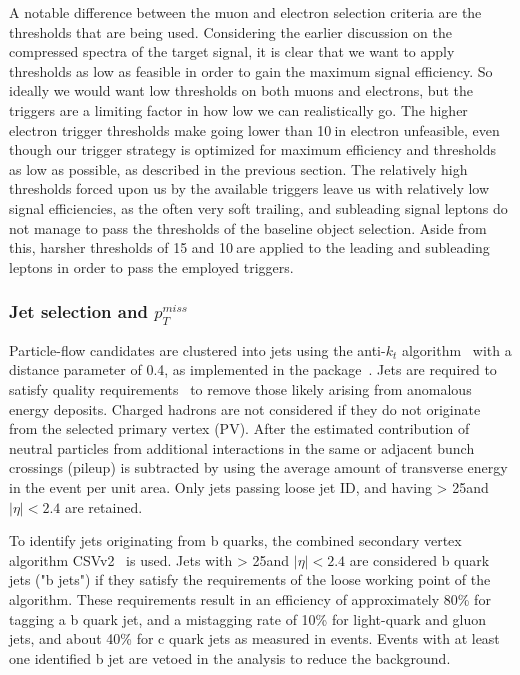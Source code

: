 A notable difference between the muon and electron selection criteria
are the \pt thresholds that are being used. Considering the earlier
discussion on the compressed \pt spectra of the target signal, it is
clear that we want to apply \pt thresholds as low as feasible in order
to gain the maximum signal efficiency. So ideally we would want low
\pt thresholds on both muons and electrons, but the triggers are a
limiting factor in how low we can realistically go. The higher
electron trigger thresholds make going lower than 10\GeV $\:$in electron \pt unfeasible, even though our trigger strategy is
optimized for maximum efficiency and thresholds as low as possible, as
described in the previous section. The relatively high \pt thresholds forced upon us by the available
triggers leave us with relatively low signal efficiencies, as the
often very soft trailing, and subleading signal leptons do not manage
to pass the thresholds of the baseline object selection.
 Aside from this, harsher \pt thresholds of 15 and 10\GeV $\:$are applied
 to the leading and subleading leptons in order to pass the employed
 triggers.

\subsubsection{Jet selection and $p_{T}^{miss}$}\label{sec:jet}
Particle-flow candidates are clustered into jets using the anti-$k_t$ algorithm~\cite{Cacciari_2008} with a distance parameter of 0.4, 
as implemented in the \FASTJET package~\cite{CACCIARI200657,Cacciari_2012}. Jets are required to satisfy quality 
requirements~\cite{Chatrchyan:2011ds,Khachatryan:2016kdb,CMS-PAS-JME-16-003} to remove those likely arising from anomalous energy deposits. 
Charged hadrons are not considered if they do not originate from the selected primary vertex (PV).
After the estimated contribution of neutral particles from additional \Pp interactions in the same or adjacent bunch crossings (pileup) 
is subtracted by using the average amount of transverse energy in the event per unit area. 
Only jets passing loose jet ID, and having \pt > 25\GeV and $|\eta| < 2.4$ are retained.

To identify jets originating from b quarks, the combined secondary vertex algorithm 
CSVv2~\cite{Chatrchyan:2012jua,CMS-PAS-BTV-15-001} is used. 
Jets with \pt > 25\GeV and $|\eta| < 2.4$ are considered b quark jets ("b jets") if they satisfy the requirements 
of the loose working point of the algorithm. 
These requirements result in an efficiency of approximately 80\% for tagging a b quark jet, and a mistagging rate of 
10\% for light-quark and gluon jets, and about 40\% for c quark jets
as measured in \ttbar events. 
Events with at least one identified b jet are vetoed in the analysis to reduce the \ttbar background.

